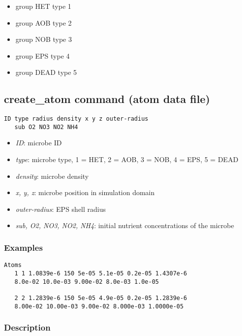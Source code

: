 \documentclass[11pt,a4paper,openright]{article}
\begin{document}
\begin{itemize}
\item group HET type 1
\item group AOB type 2
\item group NOB type 3 
\item group EPS type 4
\item group DEAD type 5
\end{itemize} 

\subsection{create\_atom command (atom data file)}
\label{createatom}

\begin{Verbatim}[frame=single]
   ID type radius density x y z outer-radius
   sub O2 NO3 NO2 NH4
\end{Verbatim}

\begin{itemize}
\item
	{\it ID}: microbe ID
\item
	{\it type}: microbe type, 1 = HET, 2 = AOB, 3 = NOB, 4 = EPS, 5 = DEAD
\item
	{\it density}: microbe density
\item
	{\it x, y, z}: microbe position in simulation domain
\item
	{\it outer-radius}: EPS shell radius
\item	
	{\it sub, O2, NO3, NO2, NH4}: initial nutrient concentrations of the microbe
\end{itemize}

\subsubsection*{Examples}

\begin{Verbatim}[frame=single]
   Atoms
   1 1 1.0839e-6 150 5e-05 5.1e-05 0.2e-05 1.4307e-6 
   8.0e-02 10.0e-03 9.00e-02 8.0e-03 1.0e-05 
   
   2 2 1.2839e-6 150 5e-05 4.9e-05 0.2e-05 1.2839e-6
   8.00e-02 10.00e-03 9.00e-02 8.000e-03 1.0000e-05 
\end{Verbatim}

\subsubsection*{Description}
\end{document}
